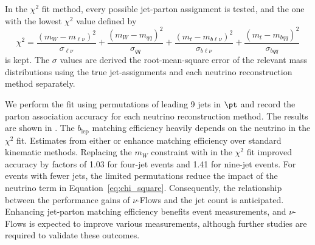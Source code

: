 In the $\chi^2$ fit method, every possible jet-parton assignment is tested, and the one with the lowest $\chi^2$ value defined by
\begin{equation}
    \chi^2=\frac{(m_W-m_{\ell\nu})^2}{\sigma_{\ell\nu}} +\frac{(m_W-m_{qq})^2}{\sigma_{qq}} +\frac{(m_t-m_{b\ell\nu})^2}{\sigma_{b\ell\nu}} +\frac{(m_t-m_{bqq})^2}{\sigma_{bqq}}
    \label{eq:chi_square}
\end{equation}
is kept.
The $\sigma$ values are derived the root-mean-square error of the relevant mass distributions using the true jet-assignments and each neutrino reconstruction method separately.

We perform the fit using permutations of leading 9 jets in $\pt$ and record the parton association accuracy for each neutrino reconstruction method.
The results are shown in .
The $b_\text{lep}$ matching efficiency heavily depends on the neutrino in the $\chi^2$ fit.
Estimates from either \vsample or \vmode enhance matching efficiency over standard kinematic methods.
Replacing the $m_W$ constraint with \vmode in the $\chi^2$ fit improved accuracy by factors of 1.03 for four-jet events and 1.41 for nine-jet events.
For events with fewer jets, the limited permutations reduce the impact of the neutrino term in Equation~\ref{eq:chi_square}.
Consequently, the relationship between the performance gains of $\nu$-Flows and the jet count is anticipated.
Enhancing jet-parton matching efficiency benefits \ttbar event measurements, and $\nu$-Flows is expected to improve various measurements, although further studies are required to validate these outcomes.

